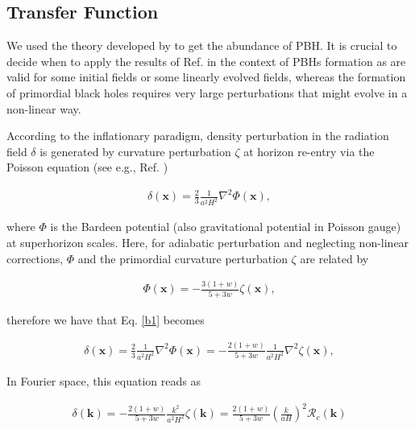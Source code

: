 \begin{appendices}


\chapter{Transfer Function}\label{Transfer function}


We used the theory developed by \cite{1986ApJ...304...15B} to get the abundance of PBH. It is crucial to decide when to apply the results of Ref. \cite{1986ApJ...304...15B} in the context of PBHs formation as are valid for some initial fields or some linearly evolved fields, whereas the formation of primordial black holes requires very large perturbations that might evolve in a non-linear way.

According to the inflationary paradigm, density perturbation in the radiation field $\delta$ is generated by curvature perturbation $\zeta$ at horizon re-entry via the Poisson equation (see e.g., Ref. \cite{2000cils.book.....L} )

\begin{align}
    \delta(\mathbf{x})=\frac{2}{3} \frac{1}{a^{2} H^{2}} \nabla^{2} \Phi(\mathbf{x}),\label{b1}
\end{align}

where $\Phi$ is the Bardeen potential (also gravitational potential in Poisson gauge) at superhorizon scales. Here, for adiabatic perturbation and neglecting non-linear corrections, $\Phi$ and the primordial curvature perturbation $\zeta$ are related by

\begin{align}
    \Phi(\mathbf{x})=-\frac{3(1+w)}{5+3 w} \zeta(\mathbf{x}),\label{b2}
\end{align}

therefore we have that Eq. \ref{b1} becomes

\begin{align}
    \delta(\mathbf{x})=\frac{2}{3} \frac{1}{a^{2} H^{2}} \nabla^{2} \Phi(\mathbf{x})=-\frac{2(1+w)}{5+3 w} \frac{1}{a^{2} H^{2}} \nabla^{2} \zeta(\mathbf{x}),\label{b3}
\end{align}

In Fourier space, this equation reads as

\begin{align}
    \delta(\mathbf{k})=-\frac{2(1+w)}{5+3 w} \frac{k^{2}}{a^{2} H^{2}} \zeta(\mathbf{k}) =\frac{2(1+w)}{5+3w}\left(\frac{k}{aH}\right)^{2} \mathcal{R}_{c}(\mathbf{k}) \label{b4}
\end{align}


\end{appendices}
